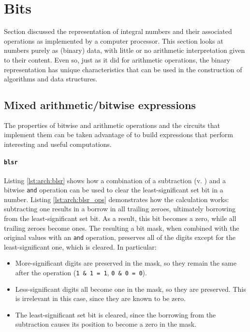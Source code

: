 \section{Bits}

Section  discussed the representation of integral numbers
and their associated operations as implemented by a computer processor.  This
section looks at numbers purely as (binary) data, with little or no arithmetic
interpretation given to their content.  Even so, just as it did for arithmetic
operations, the binary representation has unique characteristics that can be
used in the construction of algorithms and data structures.

\subsection{Mixed arithmetic/bitwise expressions}

\label{subsubsec:arch:mixed}

The properties of bitwise and arithmetic operations and the circuits that
implement them can be taken advantage of to build expressions that perform
interesting and useful computations.

\paragraph{\texttt{blsr}}

Listing \ref{lst:arch:blsr} shows how a combination of a subtraction (v.
) and a bitwise \texttt{and} operation can be used
to clear the least-significant set bit in a number.  Listing
\ref{lst:arch:blsr_ops} demonstrates how the calculation works: subtracting one
results in a borrow in all trailing zeroes, ultimately borrowing from the
least-significant set bit.  As a result, this bit becomes a zero, while all
trailing zeroes become ones.  The resulting a bit mask, when combined with the
original values with an \texttt{and} operation, preserves all of the digits
except for the least-significant one, which is cleared.  In particular:

\begin{itemize}
    \item
        More-significant digits are preserved in the mask, so they remain the
        same after the operation (\texttt{1 \& 1 = 1}, \texttt{0 \& 0 = 0}).
    \item
        Less-significant digits all become one in the mask, so they are
        preserved.  This is irrelevant in this case, since they are known to be
        zero.
    \item
        The least-significant set bit is cleared, since the borrowing from the
        subtraction causes its position to become a zero in the mask.
\end{itemize}

